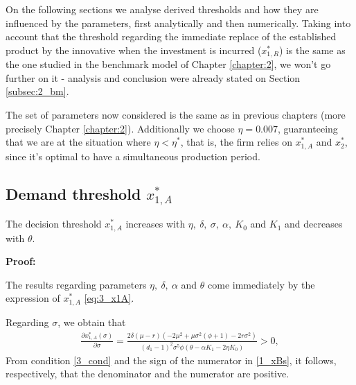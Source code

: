 \vspace{3mm}
On the following sections we analyse derived thresholds and how they are influenced by the parameters, first analytically and then numerically. 
Taking into account that the threshold regarding the immediate replace of the established product by the innovative when the investment is incurred ($x^*_{1,R}$) is the same as the one studied in the benchmark model of Chapter \ref{chapter:2}, we won't go further on it - analysis and conclusion were already stated on Section \ref{subsec:2_bm}.

The set of parameters now considered is the same as in previous chapters (more precisely Chapter \ref{chapter:2}). Additionally we choose $\eta=0.007$, guaranteeing that we are at the situation where $\eta <\eta^*$, that is, the firm relies on $x^*_{1,A}$ and $x^*_2$, since it's optimal to have a simultaneous production period.
\subsection{Demand threshold $x_{1,A}^*$}
\label{3_dmx1A}


\begin{prop}
	\label{3_propx1A}
	The decision threshold $x_{1,A}^*$ increases with $\eta, \ \delta, \ \sigma, \ \alpha, \ K_0$ and $K_1$ and decreases with $\theta$.
\end{prop}

\textbf{Proof:}

The results regarding parameters $\eta, \ \delta, \ \alpha $ and $\theta$ come immediately by the expression of $x_{1,A}^*$  \eqref{eq:3_x1A}.

Regarding $\sigma$, we obtain that
\begin{align*}
\frac{\partial x_{1,A}^* ( \sigma) }{\partial \sigma}=\frac{2 \delta  (\mu -r) \left(-2 \mu ^2+\mu  \sigma ^2 \left(\phi+1\right)-2 r \sigma ^2\right)}{(d_1-1)^2 \sigma ^5 \phi (\theta -\alpha  K_1 -2 \eta  K_0)}>0,
\end{align*}
From condition \eqref{3_cond} and the sign of the numerator in \eqref{1_xBs}, it follows, respectively, that the denominator and the numerator are positive.   %

